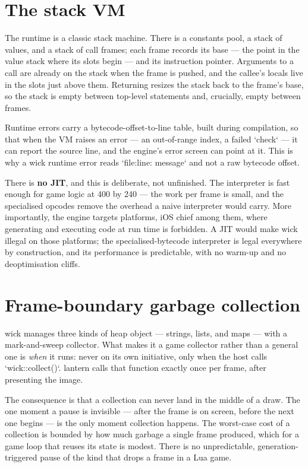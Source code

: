 \section{The stack VM}

The runtime is a classic stack machine. There is a constants pool, a stack of
values, and a stack of call frames; each frame records its base --- the point
in the value stack where its slots begin --- and its instruction pointer.
Arguments to a call are already on the stack when the frame is pushed, and the
callee's locals live in the slots just above them. Returning resizes the stack
back to the frame's base, so the stack is empty between top-level statements
and, crucially, empty between frames.

Runtime errors carry a bytecode-offset-to-line table, built during
compilation, so that when the VM raises an error --- an out-of-range index, a
failed `check` --- it can report the source line, and the engine's error screen
can point at it. This is why a wick runtime error reads `file:line: message`
and not a raw bytecode offset.

There is \textbf{no JIT}, and this is deliberate, not unfinished. The
interpreter is fast enough for game logic at 400 by 240 --- the work per frame
is small, and the specialised opcodes remove the overhead a naive interpreter
would carry. More importantly, the engine targets platforms, iOS chief among
them, where generating and executing code at run time is forbidden. A JIT
would make wick illegal on those platforms; the specialised-bytecode interpreter
is legal everywhere by construction, and its performance is predictable, with
no warm-up and no deoptimisation cliffs.

\section{Frame-boundary garbage collection}

wick manages three kinds of heap object --- strings, lists, and maps --- with a
mark-and-sweep collector. What makes it a game collector rather than a general
one is \emph{when} it runs: never on its own initiative, only when the host
calls `wick::collect()`. lantern calls that function exactly once per frame,
after presenting the image.

The consequence is that a collection can never land in the middle of a draw.
The one moment a pause is invisible --- after the frame is on screen, before the
next one begins --- is the only moment collection happens. The worst-case cost
of a collection is bounded by how much garbage a single frame produced, which
for a game loop that reuses its state is modest. There is no unpredictable,
generation-triggered pause of the kind that drops a frame in a Lua game.

